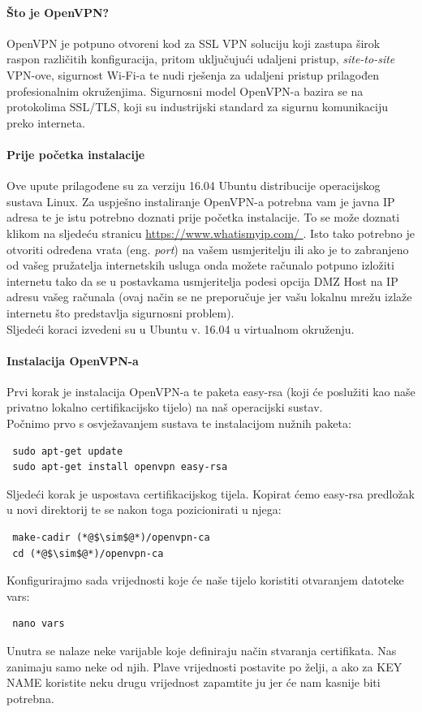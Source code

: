 


\bigbreak
\paragraph*{Što je OpenVPN?}
\hfill \smallbreak
OpenVPN\cite{openvpn} je potpuno otvoreni kod za SSL VPN soluciju koji zastupa širok raspon različitih konfiguracija, pritom uključujući udaljeni pristup, \textit{site-to-site} VPN-ove, sigurnost Wi-Fi-a te nudi rješenja za udaljeni pristup prilagođen profesionalnim okruženjima. Sigurnosni model OpenVPN-a bazira se na protokolima SSL/TLS, koji su industrijski standard za sigurnu komunikaciju preko interneta.

\bigbreak
\paragraph*{Prije početka instalacije}
\hfill \smallbreak
 Ove upute\cite{tutorialopenvpn} prilagođene su za verziju 16.04 Ubuntu distribucije operacijskog sustava Linux. Za uspješno instaliranje OpenVPN-a potrebna vam je javna IP adresa te je istu potrebno doznati prije početka instalacije. To se može doznati klikom na sljedeću stranicu \url{https://www.whatismyip.com/ }. Isto tako potrebno je otvoriti određena vrata (eng. \textit{port}) na vašem usmjeritelju ili ako je to zabranjeno od vašeg pružatelja internetskih usluga onda možete računalo potpuno izložiti internetu tako da se u postavkama usmjeritelja podesi opcija DMZ Host na IP adresu vašeg računala (ovaj način se ne preporučuje jer vašu lokalnu mrežu izlaže internetu što predstavlja sigurnosni problem).
 \\
 Sljedeći koraci izvedeni su u Ubuntu v. 16.04 u virtualnom okruženju.
 
 \bigbreak
 \paragraph*{Instalacija OpenVPN-a}
 \hfill \smallbreak
 Prvi korak je instalacija OpenVPN-a te paketa easy-rsa (koji će poslužiti kao naše privatno lokalno certifikacijsko tijelo) na naš operacijski sustav. \\
 Počnimo prvo s osvježavanjem sustava te instalacijom nužnih paketa:
\begin{lstlisting}
 sudo apt-get update
 sudo apt-get install openvpn easy-rsa
\end{lstlisting}
 Sljedeći korak je uspostava certifikacijskog tijela. Kopirat ćemo easy-rsa predložak u novi direktorij te se nakon toga pozicionirati u njega:
\begin{lstlisting}
 make-cadir (*@$\sim$@*)/openvpn-ca
 cd (*@$\sim$@*)/openvpn-ca
\end{lstlisting}
Konfigurirajmo sada vrijednosti koje će naše tijelo koristiti otvaranjem datoteke vars:
\begin{lstlisting}
 nano vars
\end{lstlisting}
Unutra se nalaze neke varijable koje definiraju način stvaranja certifikata. Nas zanimaju samo neke od njih. Plave vrijednosti postavite po želji, a ako za KEY NAME koristite neku drugu vrijednost zapamtite ju jer će nam kasnije biti potrebna.

